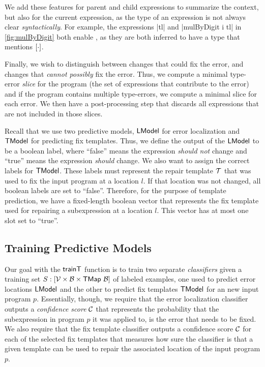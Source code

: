 We add these features for parent and child expressions to summarize the context,
but also for the current expression, as the type of an expression is not always
clear \emph{syntactically}. For example, the expressions |tl| and
|mulByDigit i tl| in \autoref{fig:mulByDigit} both enable \HasTypeList, as they
are both inferred to have a type that mentions $[\cdot]$.


Finally, we wish to distinguish between changes that could fix the error, and
changes that \emph{cannot possibly} fix the error. Thus, we compute a minimal
type-error \emph{slice} for the program (\ie the set of expressions that
contribute to the error) and if the program contains multiple type-errors, we
compute a minimal slice for each error. We then have a post-processing step that
discards all expressions that are not included in those slices.


Recall that we use two predictive models, $\mathsf{LModel}$ for error localization and
$\mathsf{TModel}$ for predicting fix templates. Thus, we define the output of the
$\mathsf{LModel}$ to be a boolean label, where ``false'' means the expression
\emph{should not} change and ``true'' means the expression \emph{should} change.
We also want to assign the correct labels for $\mathsf{TModel}$. These labels must
represent the repair template $\mathcal{T}$ that was used to fix the input program at a
location $l$. If that location was not changed, all boolean labels are set to
``false''. Therefore, for the purpose of template prediction, we have a
fixed-length boolean vector that represents the fix template used for repairing
a subexpression at a location $l$. This vector has at most one slot set to
``true''.

\subsection{Training Predictive Models}
\label{subsec:train}
\lstDeleteShortInline{|} %

Our goal with the $\mathsf{trainT}$ function is to train two separate
\emph{classifiers} given a training set $S : [\mathcal{V} \times \mathcal{B} \times
\mathsf{TMap}\ \mathcal{B}]$ of labeled examples, one used to predict error locations $\mathsf{LModel}$
and the other to predict fix templates $\mathsf{TModel}$ for an new input program $p$.
Essentially, though, we require that the error localization classifier outputs a
\emph{confidence score} $\mathcal{C}$ that represents the probability that the
subexpression in program $p$ it was applied to, is the error that needs to be
fixed. We also require that the fix template classifier outputs a confidence
score $\mathcal{C}$ for each of the selected fix templates that measures how sure the
classifier is that a given template can be used to repair the associated
location of the input program $p$.

